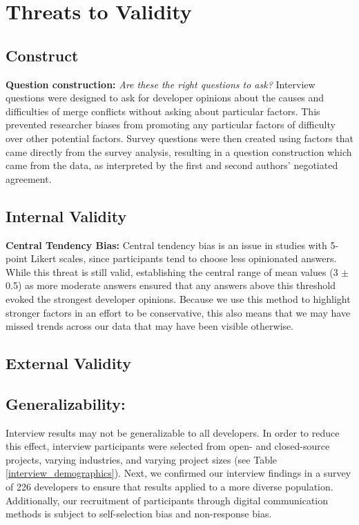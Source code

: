 \section{Threats to Validity}\label{threats}
\subsection{Construct}
\textbf{Question construction:}
\textit{Are these the right questions to ask?} Interview questions were designed to ask for developer opinions about the causes and difficulties of merge conflicts without asking about particular factors. This prevented researcher biases from promoting any particular factors of difficulty over other potential factors. 
Survey questions were then created using factors that came directly from the survey analysis, resulting in a question construction which came from the data, as interpreted by the first and second authors' negotiated agreement.
\subsection{Internal Validity}
\textbf{Central Tendency Bias:}
Central tendency bias \cite{guilford1954psychometric} is an issue in studies with 5-point Likert scales, since participants tend to choose less opinionated answers. While this threat is still valid, establishing the central range of mean values (3 $\pm$ 0.5) as more moderate answers ensured that any answers above this threshold evoked the strongest developer opinions. Because we use this method to highlight stronger factors in an effort to be conservative, this also means that we may have missed trends across our data that may have been visible otherwise.

\subsection{External Validity}

\subsection{Generalizability:}
Interview results may not be generalizable to all developers. In order to reduce this effect, interview participants were selected from open- and closed-source projects, varying industries, and varying project sizes (see Table \ref{interview_demographics}). Next, we confirmed our interview findings in a survey of 226 developers to ensure that results applied to a more diverse population. Additionally, our recruitment of participants through digital communication methods is subject to self-selection bias and non-response bias.

